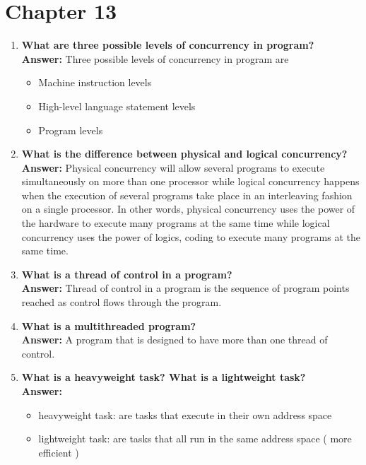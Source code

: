 \documentclass{article}
\begin{document}
\section{Chapter 13}
\begin{enumerate}[(1)]
\item
\textbf{What are three possible levels of concurrency in program?}\\
\textbf{Answer: } Three possible levels of concurrency in program are\
	\begin{itemize}
	\item Machine instruction levels
	\item High-level language statement levels
	\item Program levels
	\end{itemize}

\item
\textbf{What is the difference between physical and logical concurrency? }\\
\textbf{Answer:} Physical concurrency will allow several programs to execute simultaneously on more than one processor while logical concurrency happens when the execution of several programs take place in an interleaving fashion on a single processor. In other words, physical concurrency uses the power of the hardware to execute many programs at the same time while logical concurrency uses the power of logics, coding to execute many programs at the same time.

\item 
\textbf{What is a thread of control in a program?}\\
\textbf{Answer: } Thread of control in a program is the sequence of program points reached as control flows through the program.

\item 
\textbf{What is a multithreaded program?}\\
\textbf{Answer: } A program that is designed to have more than one thread of control.

\item
\textbf{What is a heavyweight task? What is a lightweight task?}\\
\textbf{Answer: }
	\begin{itemize}
	\item heavyweight task: are tasks that execute in their own address space
	\item lightweight task: are tasks that all run in the same address space ( more efficient )
	\end{itemize}



\end{enumerate}
\end{document}
